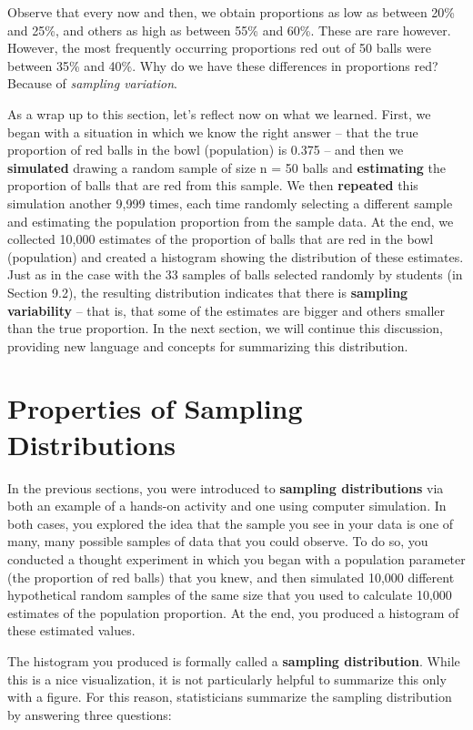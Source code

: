 \documentclass[
  letterpaper,
  DIV=11,
  numbers=noendperiod]{scrreprt}
\theoremstyle{definition}
\theoremstyle{remark}
\begin{document}
Observe that every now and then, we obtain proportions as low as between
20\% and 25\%, and others as high as between 55\% and 60\%. These are
rare however. However, the most frequently occurring proportions red out
of 50 balls were between 35\% and 40\%. Why do we have these differences
in proportions red? Because of \emph{sampling variation}.

As a wrap up to this section, let's reflect now on what we learned.
First, we began with a situation in which we know the right answer --
that the true proportion of red balls in the bowl (population) is 0.375
-- and then we \textbf{simulated} drawing a random sample of size n = 50
balls and \textbf{estimating} the proportion of balls that are red from
this sample. We then \textbf{repeated} this simulation another 9,999
times, each time randomly selecting a different sample and estimating
the population proportion from the sample data. At the end, we collected
10,000 estimates of the proportion of balls that are red in the bowl
(population) and created a histogram showing the distribution of these
estimates. Just as in the case with the 33 samples of balls selected
randomly by students (in Section 9.2), the resulting distribution
indicates that there is \textbf{sampling variability} -- that is, that
some of the estimates are bigger and others smaller than the true
proportion. In the next section, we will continue this discussion,
providing new language and concepts for summarizing this distribution.

\hypertarget{sec-properties_s}{%
\section{Properties of Sampling Distributions}\label{sec-properties_s}}

In the previous sections, you were introduced to \textbf{sampling
distributions} via both an example of a hands-on activity and one using
computer simulation. In both cases, you explored the idea that the
sample you see in your data is one of many, many possible samples of
data that you could observe. To do so, you conducted a thought
experiment in which you began with a population parameter (the
proportion of red balls) that you knew, and then simulated 10,000
different hypothetical random samples of the same size that you used to
calculate 10,000 estimates of the population proportion. At the end, you
produced a histogram of these estimated values.

The histogram you produced is formally called a \textbf{sampling
distribution}. While this is a nice visualization, it is not
particularly helpful to summarize this only with a figure. For this
reason, statisticians summarize the sampling distribution by answering
three questions:
\end{document}
